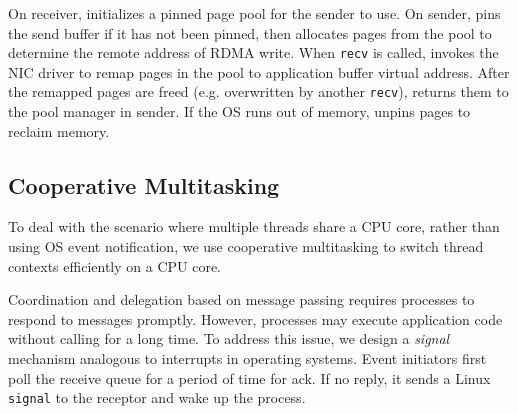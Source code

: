 On receiver, \libipc{} initializes a pinned page pool for the sender to use.
On sender, \libipc{} pins the send buffer if it has not been pinned, then allocates pages from the pool to determine the remote address of RDMA write.
When \texttt{recv} is called, \libipc invokes the NIC driver to remap pages in the pool to application buffer virtual address.
After the remapped pages are freed (e.g. overwritten by another \texttt{recv}), \libipc{} returns them to the pool manager in sender.
If the OS runs out of memory, \libipc{} unpins pages to reclaim memory.

%

\subsection{Cooperative Multitasking}
\label{subsec:process-mux}

To deal with the scenario where multiple threads share a CPU core, rather than using OS event notification, we use cooperative multitasking to switch thread contexts efficiently on a CPU core.


Coordination and delegation based on message passing requires processes to respond to messages promptly. However, processes may execute application code without calling \libipc{} for a long time. To address this issue, we design a \textit{signal} mechanism analogous to interrupts in operating systems. Event initiators  first poll the receive queue for a period of time for ack. If no reply, it sends a Linux \texttt{signal} to the receptor and wake up the process.

